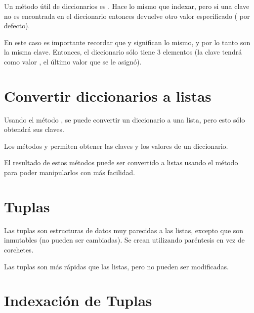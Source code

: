 Un método útil de diccionarios es . Hace lo mismo que indexar, pero si una clave no es encontrada en el diccionario entonces devuelve otro valor especificado ( por defecto).


En este caso es importante recordar que  y  significan lo mismo, y por lo tanto son la misma clave. Entonces, el diccionario  sólo tiene 3 elementos (la clave  tendrá como valor , el último valor que se le asignó).


\section{Convertir diccionarios a listas}

Usando el método , se puede convertir un diccionario a una lista, pero esto sólo obtendrá sus claves.


Los métodos  y  permiten obtener las claves y los valores de un diccionario.


El resultado de estos métodos puede ser convertido a listas usando el método  para poder manipularlos con más facilidad.


\section{Tuplas}

Las tuplas son estructuras de datos muy parecidas a las listas, excepto que son inmutables (no pueden ser cambiadas). Se crean utilizando paréntesis en vez de corchetes.


Las tuplas son más rápidas que las listas, pero no pueden ser modificadas.

\section{Indexación de Tuplas}

